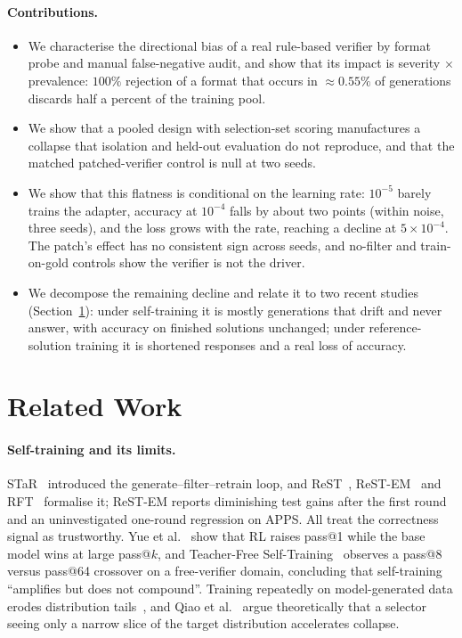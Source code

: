 \documentclass[runningheads]{llncs}
\begin{document}
\paragraph{Contributions.}
\begin{itemize}
\item We characterise the directional bias of a real rule-based verifier by
format probe and manual false-negative audit, and show that its impact is
severity $\times$ prevalence: $100\%$ rejection of a format that occurs in
$\approx0.55\%$ of generations discards half a percent of the training pool.
\item We show that a pooled design with selection-set scoring manufactures a
collapse that isolation and held-out evaluation do not reproduce, and that the
matched patched-verifier control is null at two seeds.
\item We show that this flatness is conditional on the learning rate: $10^{-5}$
barely trains the adapter, accuracy at $10^{-4}$ falls by about two points
(within noise, three seeds), and the loss grows with the rate, reaching a
decline at $5\times10^{-4}$. The patch's effect has no consistent sign across
seeds, and no-filter and train-on-gold controls show the verifier is not the
driver.
\item We decompose the remaining decline and relate it to two recent studies
(Section~\ref{sec:related}): under self-training it is mostly generations that
drift and never answer, with accuracy on finished solutions unchanged; under
reference-solution training it is shortened responses and a real loss of accuracy.
\end{itemize}

\section{Related Work}
\label{sec:related}

\paragraph{Self-training and its limits.}
STaR~\cite{ref_star} introduced the generate--filter--retrain loop, and
ReST~\cite{ref_rest}, ReST-EM~\cite{ref_restem} and RFT~\cite{ref_rft} formalise
it; ReST-EM reports diminishing test gains after the first round and an
uninvestigated one-round regression on APPS. All treat the correctness signal as
trustworthy. Yue et al.~\cite{ref_rllimit} show that RL raises pass@1 while the
base model wins at large pass@$k$, and Teacher-Free Self-Training~\cite{ref_teacherfree}
observes a pass@8 versus pass@64 crossover on a free-verifier domain, concluding
that self-training ``amplifies but does not compound''. Training repeatedly on
model-generated data erodes distribution tails~\cite{ref_collapse}, and Qiao et
al.~\cite{ref_selectionbias} argue theoretically that a selector seeing only a
narrow slice of the target distribution accelerates collapse.
\end{document}
